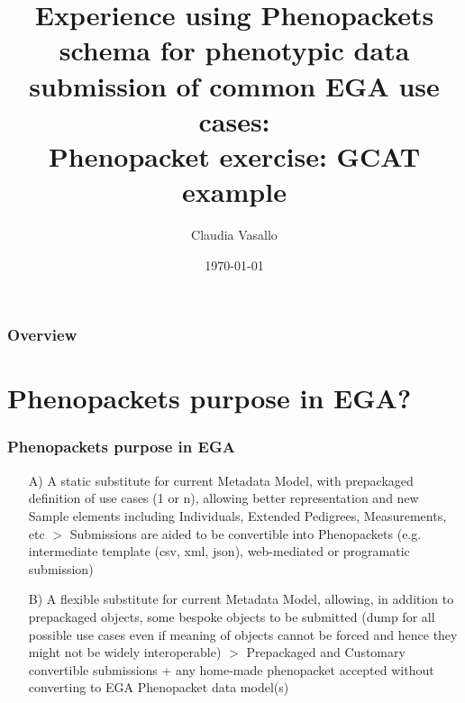 \documentclass{beamer}
\title[phenopackets exercise]{ 
Experience using Phenopackets schema for phenotypic data submission of common EGA use cases:\\
Phenopacket exercise: GCAT example} %
\author{Claudia Vasallo} %
\institute[EGA-CRG] %
{
European Genome-phenome Archive \\ %
\medskip
\textit{claudia.vasallo@crg.eu} %
}
\date{\today} %
\begin{document}
\begin{frame}
\titlepage %
\end{frame}

\begin{frame}
\frametitle{Overview} %
\tableofcontents %
\end{frame}


\section{Phenopackets purpose in EGA?} 

\begin{frame}
\frametitle{Phenopackets purpose in EGA}
\begin{itemize}

\item[A)] A static substitute for current Metadata Model, with prepackaged definition of use cases (1 or n), allowing better representation and new Sample elements including Individuals, Extended Pedigrees, Measurements, etc $>$ Submissions are aided to be convertible into Phenopackets (e.g. intermediate template (csv, xml, json), web-mediated or programatic submission) \\
\item[B)] A flexible substitute for current Metadata Model, allowing, in addition to prepackaged objects, some bespoke objects to be submitted (dump for all possible use cases even if meaning of objects cannot be forced and hence they might not be widely interoperable) $>$ Prepackaged  and Customary convertible submissions + any home-made phenopacket accepted without converting to EGA Phenopacket data model(s)


\end{itemize}
\end{frame}
\end{document}
